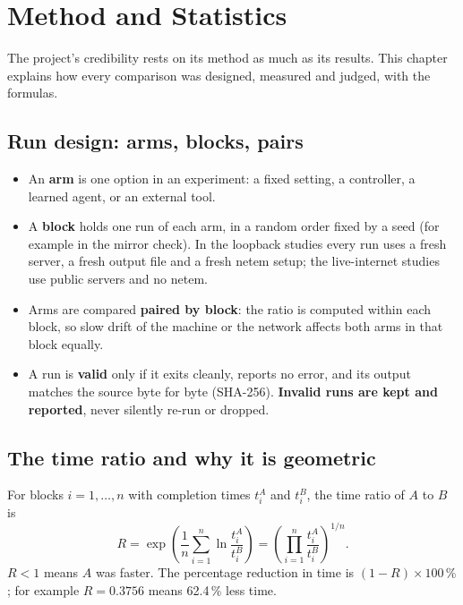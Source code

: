 \chapter{Method and Statistics}\label{ch:method}
The project's credibility rests on its method as much as its results. This chapter explains how every comparison was designed, measured and judged, with the formulas.

\section{Run design: arms, blocks, pairs}
\begin{itemize}
\item An \textbf{arm} is one option in an experiment: a fixed setting, a controller, a learned agent, or an external tool.
\item A \textbf{block} holds one run of each arm, in a random order fixed by a seed (for example  in the mirror check). In the loopback studies every run uses a fresh server, a fresh output file and a fresh netem setup; the live-internet studies use public servers and no netem.
\item Arms are compared \textbf{paired by block}: the ratio is computed within each block, so slow drift of the machine or the network affects both arms in that block equally.
\item A run is \textbf{valid} only if it exits cleanly, reports no error, and its output matches the source byte for byte (SHA-256). \textbf{Invalid runs are kept and reported}, never silently re-run or dropped.
\end{itemize}

\section{The time ratio and why it is geometric}
For blocks $i = 1,\dots,n$ with completion times $t_i^{A}$ and $t_i^{B}$, the time ratio of $A$ to $B$ is
\begin{equation}
R = \exp\!\left(\frac{1}{n}\sum_{i=1}^{n}\ln\frac{t_i^{A}}{t_i^{B}}\right) = \left(\prod_{i=1}^{n} \frac{t_i^{A}}{t_i^{B}}\right)^{1/n}.
\end{equation}
$R<1$ means $A$ was faster. The percentage reduction in time is $(1-R)\times100\,\%$; for example $R=0.3756$ means 62.4\,\% less time.


